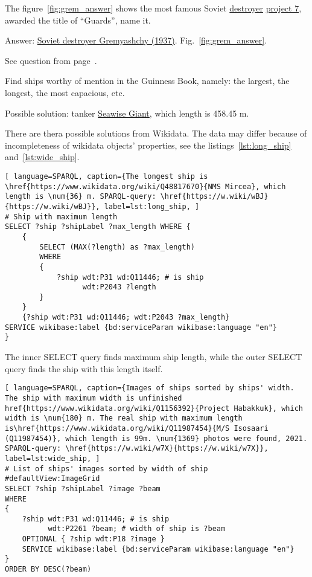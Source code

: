 \begin{exercise}
	\label{answer:ship_1}
	The figure~\ref{fig:grem_answer} shows the most famous Soviet \href{https://en.wikipedia.org/wiki/Destroyer}{destroyer} \href{https://en.wikipedia.org/wiki/Gnevny-class_destroyer}{project 7}, awarded the title of ``Guards'', name it.
\end{exercise}

Answer: \href{https://en.wikipedia.org/wiki/Soviet_destroyer_Gremyashchy_(1937)}{Soviet destroyer Gremyashchy (1937)}. Fig.~\ref{fig:grem_answer}.

\small{See question from page~\pageref{question:ship_1}.}


\begin{exercise}
	\label{answer:ship_2}
	Find ships worthy of mention in the Guinness Book, namely: the largest, the longest, the most capacious, etc.
\end{exercise}

Possible solution: tanker \href{https://en.wikipedia.org/wiki/Seawise_Giant}{Seawise Giant}, which length is 458.45 m.

There are thera possible solutions from Wikidata. The data may differ because of incompleteness of wikidata objects' properties, see the listings~\ref{lst:long_ship} and~\ref{lst:wide_ship}.
\begin{lstlisting}[ language=SPARQL, caption={The longest ship is \href{https://www.wikidata.org/wiki/Q48817670}{NMS Mircea}, which length is \num{36} m. SPARQL-query: \href{https://w.wiki/wBJ}{https://w.wiki/wBJ}}, label=lst:long_ship, ]
# Ship with maximum length
SELECT ?ship ?shipLabel ?max_length WHERE {
	{
		SELECT (MAX(?length) as ?max_length)
		WHERE
		{
			?ship wdt:P31 wd:Q11446; # is ship
				  wdt:P2043 ?length
		}
	}
	{?ship wdt:P31 wd:Q11446; wdt:P2043 ?max_length}
SERVICE wikibase:label {bd:serviceParam wikibase:language "en"}
}  
\end{lstlisting}

The inner SELECT query finds maximum ship length, while the outer SELECT query finds the ship with this length itself.

\begin{lstlisting}[ language=SPARQL, caption={Images of ships sorted by ships' width. The ship with maximum width is unfinished href{https://www.wikidata.org/wiki/Q1156392}{Project Habakkuk}, which width is \num{180} m. The real ship with maximum length is\href{https://www.wikidata.org/wiki/Q11987454}{M/S Isosaari (Q11987454)}, which length is 99m. \num{1369} photos were found, 2021. SPARQL-query: \href{https://w.wiki/w7X}{https://w.wiki/w7X}}, label=lst:wide_ship, ]
# List of ships' images sorted by width of ship
#defaultView:ImageGrid
SELECT ?ship ?shipLabel ?image ?beam
WHERE 
{
	?ship wdt:P31 wd:Q11446; # is ship
		  wdt:P2261 ?beam; # width of ship is ?beam
	OPTIONAL { ?ship wdt:P18 ?image }
	SERVICE wikibase:label {bd:serviceParam wikibase:language "en"}
}
ORDER BY DESC(?beam)
\end{lstlisting}

